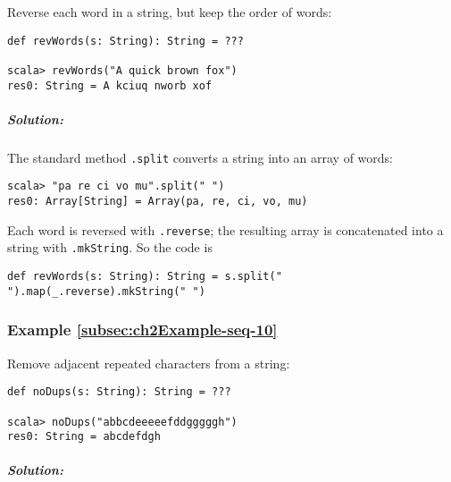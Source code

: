 Reverse each word in a string, but keep the order of words:
\begin{lstlisting}
def revWords(s: String): String = ???

scala> revWords("A quick brown fox")
res0: String = A kciuq nworb xof
\end{lstlisting}

\subparagraph{Solution:}

The standard method \lstinline!.split!
converts a string into an array of words:
\begin{lstlisting}
scala> "pa re ci vo mu".split(" ")
res0: Array[String] = Array(pa, re, ci, vo, mu)
\end{lstlisting}
Each word is reversed with \lstinline!.reverse!;
the resulting array is concatenated into a string with \lstinline!.mkString!.
So the code is
\begin{lstlisting}
def revWords(s: String): String = s.split(" ").map(_.reverse).mkString(" ")
\end{lstlisting}

\subsubsection{Example \label{subsec:ch2Example-seq-10}\ref{subsec:ch2Example-seq-10}}

Remove adjacent repeated characters from a string:
\begin{lstlisting}
def noDups(s: String): String = ???

scala> noDups("abbcdeeeeefddgggggh")
res0: String = abcdefdgh
\end{lstlisting}

\subparagraph{Solution:}

